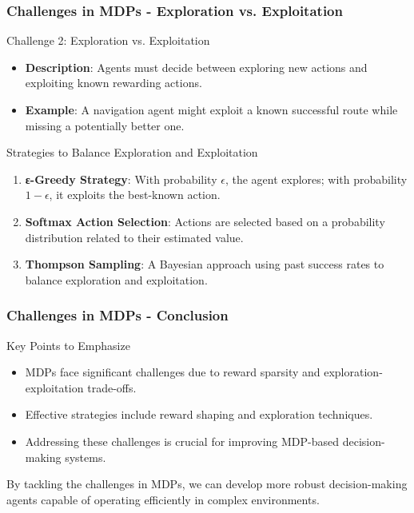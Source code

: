 \documentclass[aspectratio=169]{beamer}
\begin{document}
\begin{frame}[fragile]
    \frametitle{Challenges in MDPs - Exploration vs. Exploitation}
    \begin{block}{Challenge 2: Exploration vs. Exploitation}
        \begin{itemize}
            \item \textbf{Description}: Agents must decide between exploring new actions and exploiting known rewarding actions.
            \item \textbf{Example}: A navigation agent might exploit a known successful route while missing a potentially better one.
        \end{itemize}
    \end{block}
    
    \begin{block}{Strategies to Balance Exploration and Exploitation}
        \begin{enumerate}
            \item \textbf{ε-Greedy Strategy}: With probability $\epsilon$, the agent explores; with probability $1-\epsilon$, it exploits the best-known action.
            \item \textbf{Softmax Action Selection}: Actions are selected based on a probability distribution related to their estimated value.
            \item \textbf{Thompson Sampling}: A Bayesian approach using past success rates to balance exploration and exploitation.
        \end{enumerate}
    \end{block}
\end{frame}

\begin{frame}[fragile]
    \frametitle{Challenges in MDPs - Conclusion}
    \begin{block}{Key Points to Emphasize}
        \begin{itemize}
            \item MDPs face significant challenges due to reward sparsity and exploration-exploitation trade-offs.
            \item Effective strategies include reward shaping and exploration techniques.
            \item Addressing these challenges is crucial for improving MDP-based decision-making systems.
        \end{itemize}
    \end{block}
    
    By tackling the challenges in MDPs, we can develop more robust decision-making agents capable of operating efficiently in complex environments.
\end{frame}
\end{document}
